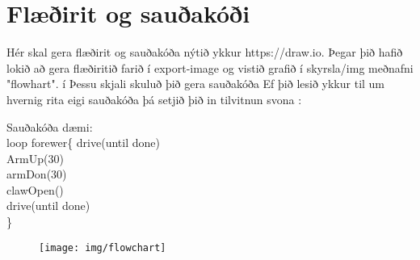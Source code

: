 \section{Flæðirit og sauðakóði}Hér skal gera flæðirit og sauðakóða nýtið ykkur https://draw.io. Þegar þið hafið lokið að gera flæðiritið farið í export-image og vistið grafið í skyrsla/img meðnafni "flowhart". í Þessu skjali skuluð þið gera sauðakóða 
Ef þið lesið ykkur til um hvernig rita eigi sauðakóða þá setjið þið in tilvitnun  svona : \cite{hartman1989writing}

Sauðakóða dæmi:\\
loop forewer\{
  drive(until done)\\
  ArmUp(30)\\
  armDon(30)\\
  clawOpen()\\
  drive(until done)\\
\}
\begin{figure}[h]
\texttt{[image: img/flowchart]}
\end{figure}

